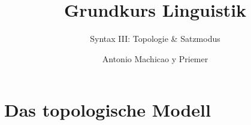 

\title{Grundkurs Linguistik}

\subtitle{Syntax III: Topologie \& Satzmodus}

\author[aMyP]{
	{\small Antonio Machicao y Priemer}
}


\date{ }





\huberlintitlepage




\nocite{Glueck05a} 
\nocite{Luedeling2009a} 
\nocite{MuellerS13f} 
\nocite{MuellerS15b}
\nocite{Repp&Co15a} 
\nocite{Woellstein10a}

\nocite{Altmann&Hofmann08a}
\nocite{Altmann93a}


\section{Das topologische Modell}



